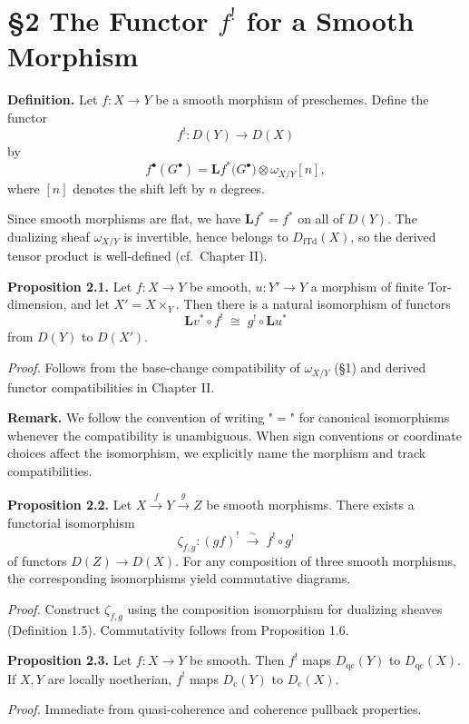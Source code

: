 \setcounter{page}{145}
\section{\S2 The Functor $f^!$ for a Smooth Morphism}

\textbf{Definition.}
Let $f\colon X\to Y$ be a smooth morphism of preschemes.
Define the functor
\[
f^!\colon D(Y)\to D(X)
\]
by
\[
f^\bullet(G^\bullet) = \mathbf{L}f^*\big(G^\bullet\big) \otimes \omega_{X/Y}[n],
\]
where $[n]$ denotes the shift left by $n$ degrees.

Since smooth morphisms are flat, we have $\mathbf{L}f^* = f^*$ on all of $D(Y)$.
The dualizing sheaf $\omega_{X/Y}$ is invertible, hence belongs to $D_{\mathrm{fTd}}(X)$,
so the derived tensor product is well-defined (cf.\ Chapter II).

\textbf{Proposition 2.1.}
Let $f\colon X\to Y$ be smooth, $u\colon Y'\to Y$ a morphism of finite Tor-dimension,
and let $X' = X\times_Y$. Then there is a natural isomorphism of functors
\[
\mathbf{L}v^*\circ f^! \;\cong\; g^!\circ \mathbf{L}u^*
\]
from $D(Y)$ to $D(X')$.

\textit{Proof.}
Follows from the base-change compatibility of $\omega_{X/Y}$ (\S1)
and derived functor compatibilities in Chapter II.

\setcounter{page}{146}
\textbf{Remark.}
We follow the convention of writing "$=$" for canonical isomorphisms whenever the compatibility is unambiguous.
When sign conventions or coordinate choices affect the isomorphism, we explicitly name the morphism and track compatibilities.

\textbf{Proposition 2.2.}
Let $X\xrightarrow{f}Y\xrightarrow{g}Z$ be smooth morphisms.
There exists a functorial isomorphism
\[
\zeta_{f,g}\colon (gf)^! \;\xrightarrow{\sim}\; f^!\circ g^!
\]
of functors $D(Z)\to D(X)$.
For any composition of three smooth morphisms, the corresponding isomorphisms yield commutative diagrams.

\textit{Proof.}
Construct $\zeta_{f,g}$ using the composition isomorphism for dualizing sheaves (Definition 1.5).
Commutativity follows from Proposition 1.6.

\textbf{Proposition 2.3.}
Let $f\colon X\to Y$ be smooth.
Then $f^!$ maps $D_{\mathrm{qc}}(Y)$ to $D_{\mathrm{qc}}(X)$.
If $X,Y$ are locally noetherian, $f^!$ maps $D_{\mathrm{c}}(Y)$ to $D_{\mathrm{c}}(X)$.

\textit{Proof.}
Immediate from quasi-coherence and coherence pullback properties.

